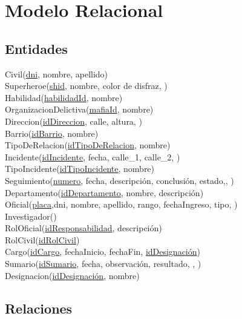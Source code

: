 \documentclass[a4paper,10pt]{article}
\title{}
\author{}
\begin{document}
\maketitle
\section{Modelo Relacional}\label{modelo-relacional}

\subsection{Entidades}\label{entidades}

Civil(\uline{dni}, nombre, apellido)\\
Superheroe(\uline{shid}, nombre, color de disfraz, )\\
Habilidad(\uline{habilidadId}, nombre)\\
OrganizacionDelictiva(\uline{mafiaId}, nombre)\\
Direccion(\uline{idDireccion}, calle, altura, )\\
Barrio(\uline{idBarrio}, nombre)\\
TipoDeRelacion(\uline{idTipoDeRelacion}, nombre)\\
Incidente(\uline{idIncidente}, fecha, calle\_1, calle\_2,
)\\
TipoIncidente(\uline{idTipoIncidente}, nombre)\\
Seguimiento(\uline{numero}, fecha, descripción, conclusión,
estado,, )\\
Departamento(\uline{idDepartamento}, nombre, descripción)\\
Oficial(\uline{placa},dni, nombre, apellido, rango, fechaIngreso, tipo,
) \\
Investigador()\\
RolOficial(\uline{idResponsabilidad}, descripción)\\
RolCivil(\uline{idRolCivil})\\
Cargo(\uline{idCargo}, fechaInicio, fechaFin, \uline{idDesignación})\\
Sumario(\uline{idSumario}, fecha, observación, resultado, ,
)\\
Designacion(\uline{idDesignación}, nombre) \\

\subsection{Relaciones}\label{relaciones}
\end{document}
